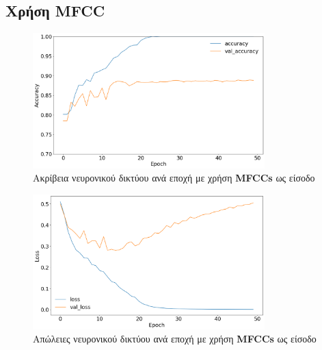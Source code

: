 \documentclass[../main.tex]{subfiles}
\begin{document}
\subsection{Χρήση MFCC}
\begin{figure}[H]
	\center
	\includegraphics[width=0.8\textwidth]{../images/accuracy_mfcc.png}
	\caption{Ακρίβεια νευρονικού δικτύου ανά εποχή με χρήση \textbf{MFCCs} ως
		είσοδο}
	\label{accuracy_mfcc}
\end{figure}
\begin{figure}[H]
	\center
	\includegraphics[width=0.8\textwidth]{../images/loss_mfcc.png}
	\caption{Απώλειες νευρονικού δικτύου ανά εποχή με χρήση \textbf{MFCCs} ως
		είσοδο}
	\label{loss_mfcc}
\end{figure}
\end{document}
